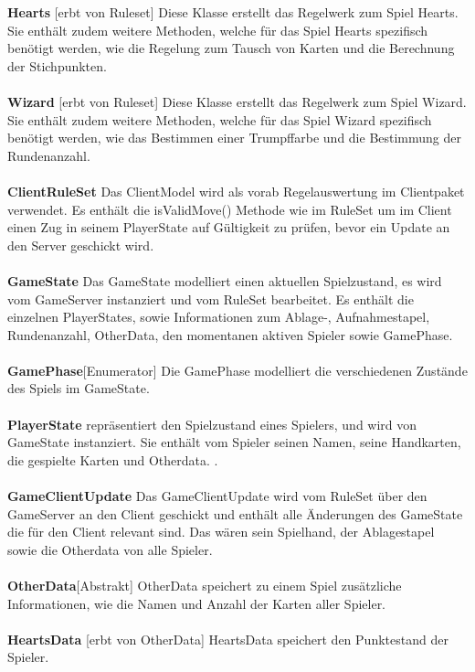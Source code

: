 \documentclass{article}
\begin{document}
		\textbf{Hearts} [erbt von Ruleset]  Diese Klasse erstellt das Regelwerk zum Spiel Hearts. Sie enthält zudem weitere Methoden, welche für das Spiel Hearts spezifisch benötigt werden, wie die Regelung zum Tausch von Karten und die Berechnung der Stichpunkten. \\ \\
		
		\textbf{Wizard} [erbt von Ruleset] Diese Klasse erstellt das Regelwerk zum Spiel Wizard. Sie enthält zudem weitere Methoden, welche für das Spiel Wizard spezifisch benötigt werden, wie das Bestimmen einer Trumpffarbe und die Bestimmung der Rundenanzahl. \\ \\
		
		\textbf{ClientRuleSet}  Das ClientModel wird als vorab Regelauswertung im Clientpaket verwendet. Es enthält die isValidMove() Methode wie im RuleSet um im Client einen Zug in seinem PlayerState auf Gültigkeit zu prüfen, bevor ein Update an den Server geschickt wird. \\ \\
		
		\textbf{GameState} Das GameState modelliert einen aktuellen Spielzustand, es wird vom GameServer instanziert und vom RuleSet bearbeitet. Es enthält die einzelnen PlayerStates, sowie Informationen zum Ablage-, Aufnahmestapel, Rundenanzahl, OtherData, den momentanen aktiven Spieler sowie GamePhase. \\ \\
		
		\textbf{GamePhase}[Enumerator] Die GamePhase modelliert die verschiedenen Zustände des Spiels im GameState. \\ \\
		
		\textbf{PlayerState} repräsentiert den Spielzustand eines Spielers, und wird von GameState instanziert. Sie enthält vom Spieler seinen Namen, seine Handkarten, die gespielte Karten und Otherdata. . \\ \\
		
		\textbf{GameClientUpdate} Das GameClientUpdate wird vom RuleSet über den GameServer an den Client geschickt und enthält alle Änderungen des GameState die für den Client relevant sind. Das wären sein Spielhand, der Ablagestapel sowie die Otherdata  von alle Spieler. \\ \\
		
		\textbf{OtherData}[Abstrakt] OtherData speichert zu einem Spiel zusätzliche Informationen, wie die Namen und Anzahl der Karten aller Spieler. \\ \\
		\textbf{HeartsData} [erbt von OtherData] HeartsData speichert den Punktestand der Spieler. \\ \\
		
\end{document}

